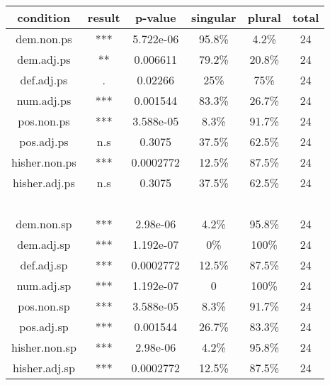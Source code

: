 \documentclass[
  11pt          %
  ,letterpaper  %
  ,center       %
  ,noupper      %
  ]{uconnthesis2}
\begin{document}
\begin{table}[h!] \small \centering
{
\begin{tabular}{ | c | c | c | c | c | c |} \hline 
condition		&	result		&	p-value 		& 	singular				&	plural				&	total		\\ \hline
dem.non.ps	&	***			&	5.722e-06		&	\cellcolor{yellow}95.8\%	&	4.2\%			  	&	24		\\ \hline
dem.adj.ps	&	**			&	0.006611		&	\cellcolor{yellow}79.2\%	&	20.8\%				&	24		\\ \hline
def.adj.ps		&	.			&	0.02266		&	25\%					&	75\%					&	24		\\ \hline
num.adj.ps	&	***			&	0.001544		&	\cellcolor{yellow}83.3\%	&	26.7\%				&	24		\\ \hline
pos.non.ps	&	***			&	3.588e-05		&	8.3\%				&	\cellcolor{yellow}91.7\%	&	24		\\ \hline
pos.adj.ps		&	n.s			&	0.3075		&	37.5\%				&	62.5\%				&	24		\\ \hline
hisher.non.ps	&	***			&	0.0002772	&	12.5\%				&	\cellcolor{yellow}87.5\%	&	24		\\ \hline
hisher.adj.ps	&	n.s			&	0.3075		&	37.5\%				&	62.5\%				&	24		\\ \hline
~			&	~			&	~			&	~					&	~					&	~		\\ \hline
dem.non.sp	&	***			&	2.98e-06		&	4.2\%				&	\cellcolor{yellow}95.8\%	&	24		\\ \hline
dem.adj.sp	&	***			&	1.192e-07		&	0\%					&	\cellcolor{yellow}100\%	&	24		\\ \hline
def.adj.sp		&	***			&	0.0002772	&	12.5\%				&	\cellcolor{yellow}87.5\%	&	24		\\ \hline
num.adj.sp	&	***			&	1.192e-07		&	0					&	\cellcolor{yellow}100\%	&	24		\\ \hline
pos.non.sp	&	***			&	3.588e-05		&	8.3\%				&	\cellcolor{yellow}91.7\%	&	24		\\ \hline
pos.adj.sp		&	***			&	0.001544		&	26.7\%				&	\cellcolor{yellow}83.3\%	&	24		\\ \hline
hisher.non.sp	&	***			&	2.98e-06		&	4.2\%				&	\cellcolor{yellow}95.8\%	&	24		\\ \hline
hisher.adj.sp	&	***			&	0.0002772	&	12.5\%				&	\cellcolor{yellow}87.5\%	&	24		\\ \hline


\end{tabular}}
\end{table}
\end{document}
